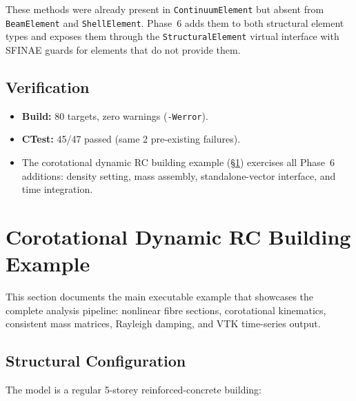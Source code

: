 These methods were already present in \texttt{ContinuumElement} but absent
from \texttt{BeamElement} and \texttt{ShellElement}.  Phase~6 adds them
to both structural element types and exposes them through the
\texttt{StructuralElement} virtual interface with SFINAE guards for
elements that do not provide them.

\subsection{Verification}

\begin{itemize}
  \item \textbf{Build:} 80 targets, zero warnings (\texttt{-Werror}).
  \item \textbf{CTest:} 45/47 passed (same 2 pre-existing failures).
  \item The corotational dynamic RC building example
        (\S\ref{sec:dynamic-rc-example}) exercises all Phase~6
        additions: density setting, mass assembly, standalone-vector
        interface, and time integration.
\end{itemize}



\section{Corotational Dynamic RC Building Example}
\label{sec:dynamic-rc-example}

This section documents the main executable example that showcases the
complete analysis pipeline: nonlinear fibre sections, corotational
kinematics, consistent mass matrices, Rayleigh damping, and VTK
time-series output.

\subsection{Structural Configuration}

The model is a regular 5-storey reinforced-concrete building:

